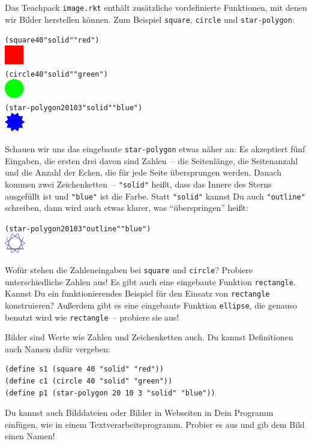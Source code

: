 Das Teachpack \texttt{image.rkt} enthält zusätzliche vordefinierte
Funktionen, mit denen wir Bilder herstellen können.  Zum Beispiel
\texttt{square}, \texttt{circle} und \texttt{star-polygon}:
%
\begin{alltt}
(square 40 "solid" "red")
\evalsto{} \includegraphics[height=24pt]{i1prog/square}
(circle 40 "solid" "green")
\evalsto{} \includegraphics[height=24pt]{i1prog/circle}
(star-polygon 20 10 3 "solid" "blue")
\evalsto{} \includegraphics[height=24pt]{i1prog/starpolygon}
\end{alltt}
%
Schauen wir uns das eingebaute \texttt{star-polygon} etwas näher an:
Es akzeptiert fünf Eingaben, die ersten drei davon sind Zahlen~-- die
Seitenlänge, die Seitenanzahl und die Anzahl der Ecken, die für jede
Seite übersprungen werden.  Danach kommen zwei Zeichenketten~--
\verb|"solid"| heißt, dass das Innere des Sterns ausgefüllt ist und
\verb|"blue"| ist die Farbe.  Statt \verb|"solid"| kannst Du auch
\verb|"outline"| schreiben, dann wird auch etwas klarer, was
"`überspringen"' heißt:
%
\begin{alltt}
(star-polygon 20 10 3 "outline" "blue")
\evalsto{} \includegraphics[height=24pt]{i1prog/starpolygon_outline}
\end{alltt}
%
\begin{aufgabe}
  Wofür stehen die Zahleneingaben bei \texttt{square} und
  \texttt{circle}?  Probiere unterschiedliche Zahlen aus!  Es gibt
  auch eine eingebaute Funktion \texttt{rectangle}.  Kannst Du ein
  funktionierendes Beispiel für den Einsatz von \texttt{rectangle}
  konstruieren?  Außerdem gibt es eine eingebaute Funktion
  \texttt{ellipse}, die genauso benutzt wird wie \texttt{rectangle}~--
  probiere sie aus!
\end{aufgabe}
%
Bilder sind Werte wie Zahlen und Zeichenketten auch.  Du kannst
Definitionen auch Namen dafür vergeben:
%
\begin{verbatim}
(define s1 (square 40 "solid" "red"))
(define c1 (circle 40 "solid" "green"))
(define p1 (star-polygon 20 10 3 "solid" "blue"))
\end{verbatim}
%
\begin{aufgabe}
  Du kannst auch Bilddateien oder Bilder in Webseiten in Dein Programm
  einfügen, wie in einem Textverarbeitsprogramm.  Probier es aus und
  gib dem Bild einen Namen!
\end{aufgabe}

